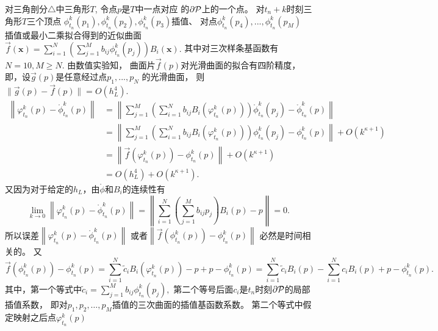 \begin{pro}
  对三角剖分$\triangle$中三角形$T$,
  令点$p $是$T$中一点对应
  的$ \partial {\cal P}$上的一个点。
  对$t_n+k$时刻三角形$T$三个顶点
  $\phi^k_{t_n}(p_1),\phi^k_{t_n}(p_2),
  \phi^k_{t_n}(p_3)$插值、
  对点$\phi^k_{t_n}(p_4),...,\phi^k_{t_n}(p_M)$
  插值或最小二乘拟合得到的近似曲面
  $\vec{f}(\mathbf{x})=\sum_{i=1}^{N}
  (\sum_{j=1}^Mb_{ij}\phi^k_{t_n}(p_j))B_i(\mathbf{x}).$
  其中对三次样条基函数有$N=10,M\geq N.$
  由数值实验知，
  曲面片$\vec{f}(p)$对光滑曲面的拟合有四阶精度，
  即，设$\vec{g}(p)$是任意经过点$p_1,...,p_N$
  的光滑曲面，%
  则$\lVert \vec{g}(p)-\vec{f}(p)\rVert =O(h_L^4).$
  \begin{equation}
    \label{eq:2}
    \begin{aligned}
   \left\lVert\varphi^k_{t_n}(p)-\mathring{\phi}^k_{t_n}(p)
     \right\rVert &=\left\lVert
     \sum_{j=1}^M\left(\sum_{i=1}^{N}
       b_{ij}B_i\left(\varphi^k_{t_n}(p)\right)\right)
     \mathring{\phi}^k_{t_n}(p_j)
    -\mathring{\phi}^k_{t_n}(p) \right\rVert\\
    &=\left\lVert
      \sum_{j=1}^M\left(\sum_{i=1}^{N}b_{ij}B_i
        \left(\varphi^k_{t_n}(p)\right)\right)
      \phi^k_{t_n}(p_j)-\phi^k_{t_n}(p)\right\rVert
    +O(k^{\kappa+1})\\
    &=\left\lVert
      \vec{f}(\varphi^k_{t_n}(p))-\phi^k_{t_n}(p)\right\rVert
    +O(k^{\kappa+1})\\
    &=O(h_L^4)+O(k^{\kappa+1}).
  \end{aligned}
\end{equation}
又因为对于给定的$h_L$，由$\mathring{\phi}$和$B_i$的连续性有
$$\lim_{k\rightarrow 0}\left\lVert
  \varphi^k_{t_n}(p)-\mathring{\phi}^k_{t_n}(p)
\right\rVert = \left\lVert
  \sum_{i=1}^{N}(\sum_{j=1}^Mb_{ij}p_j)B_i(p)-p\right\rVert=0.$$
所以误差$\left\lVert \varphi^k_{t_n}(p)
-\mathring{\phi}^k_{t_n}(p)\right\rVert$
或者$\left\lVert
      \vec{f}(\phi^k_{t_n}(p))-\phi^k_{t_n}(p)\right\rVert$
必然是时间相关的。
又
\begin{equation}
  \vec{f}(\phi^k_{t_n}(p))-\phi^k_{t_n}(p)
    =\sum_{i=1}^{N}\tilde{c}_iB_i\left(\varphi^k_{t_n}(p)\right)
    -p+p-\phi^k_{t_n}(p)
    = \sum_{i=1}^{N}\tilde{c}_iB_i\left(p\right) -\sum_{i=1}^{N}c_iB_i(p)
    +p-\phi^k_{t_n}(p).
\end{equation}
其中，第一个等式中$\tilde{c}_i=\sum_{j=1}^{M}b_{ij}\phi^k_{t_n}(p_j),$
第二个等号后面$c_i$是$t_n$时刻$\partial {\cal P}$的局部插值系数，
即对$p_1,p_2,\ldots,p_M$插值的三次曲面的插值基函数系数。
第二个等式中假定映射之后点$\varphi^k_{t_n}(p)$

\end{pro}
